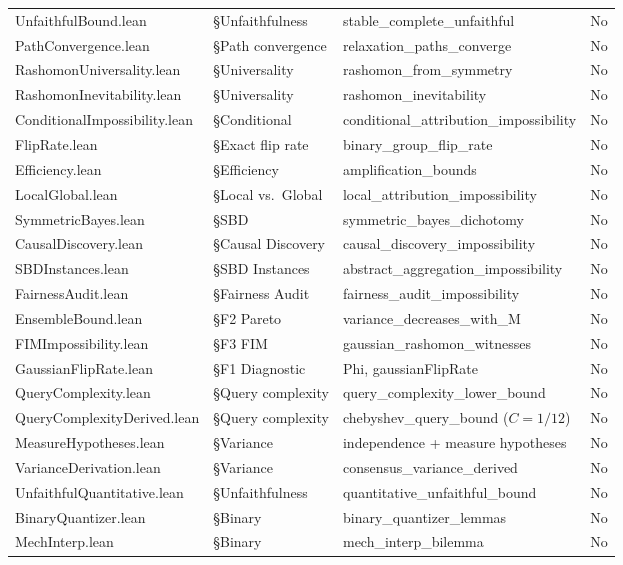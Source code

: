 \documentclass{article}
\begin{document}
\begin{table}[htbp]
\begin{tabular}{@{}l>{\raggedright\arraybackslash}p{3cm}>{\raggedright\arraybackslash}p{5.5cm}l@{}}
UnfaithfulBound.lean & \S Unfaithfulness & stable\_complete\_unfaithful & No \\
PathConvergence.lean & \S Path convergence & relaxation\_paths\_converge & No \\
RashomonUniversality.lean & \S Universality & rashomon\_from\_symmetry & No \\
RashomonInevitability.lean & \S Universality & rashomon\_inevitability & No \\
ConditionalImpossibility.lean & \S Conditional & conditional\_attribution\_impossibility & No \\
FlipRate.lean & \S Exact flip rate & binary\_group\_flip\_rate & No \\
Efficiency.lean & \S Efficiency & amplification\_bounds & No \\
LocalGlobal.lean & \S Local vs.\ Global & local\_attribution\_impossibility & No \\
SymmetricBayes.lean & \S SBD & symmetric\_bayes\_dichotomy & No \\
CausalDiscovery.lean & \S Causal Discovery & causal\_discovery\_impossibility & No \\
SBDInstances.lean & \S SBD Instances & abstract\_aggregation\_impossibility & No \\
FairnessAudit.lean & \S Fairness Audit & fairness\_audit\_impossibility & No \\
EnsembleBound.lean & \S F2 Pareto & variance\_decreases\_with\_M & No \\
FIMImpossibility.lean & \S F3 FIM & gaussian\_rashomon\_witnesses & No \\
GaussianFlipRate.lean & \S F1 Diagnostic & Phi, gaussianFlipRate & No \\
QueryComplexity.lean & \S Query complexity & query\_complexity\_lower\_bound & No \\
QueryComplexityDerived.lean & \S Query complexity & chebyshev\_query\_bound ($C{=}1/12$) & No \\
MeasureHypotheses.lean & \S Variance & independence + measure hypotheses & No \\
VarianceDerivation.lean & \S Variance & consensus\_variance\_derived & No \\
UnfaithfulQuantitative.lean & \S Unfaithfulness & quantitative\_unfaithful\_bound & No \\
BinaryQuantizer.lean & \S Binary & binary\_quantizer\_lemmas & No \\
MechInterp.lean & \S Binary & mech\_interp\_bilemma & No \\

\end{tabular}
\end{table}
\end{document}
